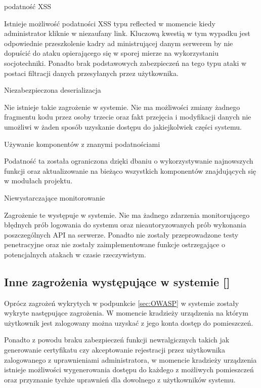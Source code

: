 \begin{enumerate*}
	 \item podatność XSS
	 
	 Istnieje możliwość podatności XSS typu reflected w momencie kiedy administrator kliknie w niezaufany link. Kluczową kwestią w tym wypadku jest odpowiednie przeszkolenie kadry ad ministrującej danym serwerem by nie dopuścić do ataku opierającego się w sporej mierze na wykorzystaniu socjotechniki. Ponadto brak podstawowych zabezpieczeń na tego typu ataki w postaci filtracji danych przesyłanych przez użytkownika. 
	 
	 \item Niezabezpieczona deserializacja
	 
	 Nie istnieje takie zagrożenie w systemie. Nie ma możliwości zmiany żadnego fragmentu kodu przez osoby trzecie oraz fakt przejęcia i modyfikacji danych nie umożliwi w żaden sposób uzyskanie dostępu do jakiejkolwiek części systemu.
	 
	 \item  Używanie komponentów z znanymi podatnościami
	 
	 Podatność ta została ograniczona dzięki dbaniu o wykorzystywanie najnowszych funkcji oraz aktualizowanie na bieżąco wszystkich komponentów znajdujących się w modułach projektu.
	 
	 \item Niewystarczające monitorowanie 
	 
	 Zagrożenie te występuje w systemie. Nie ma żadnego zdarzenia monitorującego błędnych prób logowania do systemu oraz nieautoryzowanych prób wykonania poszczególnych API na serwerze. Ponadto nie zostały przeprowadzone testy penetracyjne oraz nie zostały zaimplementowane funkcje ostrzegające o potencjalnych atakach w czasie rzeczywistym.      
\end{enumerate*}

\subsection{Inne zagrożenia występujące w systemie [\StudentB]}

Oprócz zagrożeń wykrytych w podpunkcie \ref{sec:OWASP} w systemie zostały wykryte następujące zagrożenia. W momencie kradzieży urządzenia na którym użytkownik jest zalogowany można uzyskać z jego konta dostęp do pomieszczeń.
 
 Ponadto z powodu braku zabezpieczeń funkcji newralgicznych takich jak generowanie certyfikatu czy akceptowanie rejestracji przez użytkownika zalogowanego z uprawnieniami administratora, w momencie kradzieży urządzenia istnieje możliwości wygenerowania dostępu do każdego z możliwych pomieszczeń oraz przyznanie tychże uprawnień dla dowolnego z użytkowników systemu. 
 
